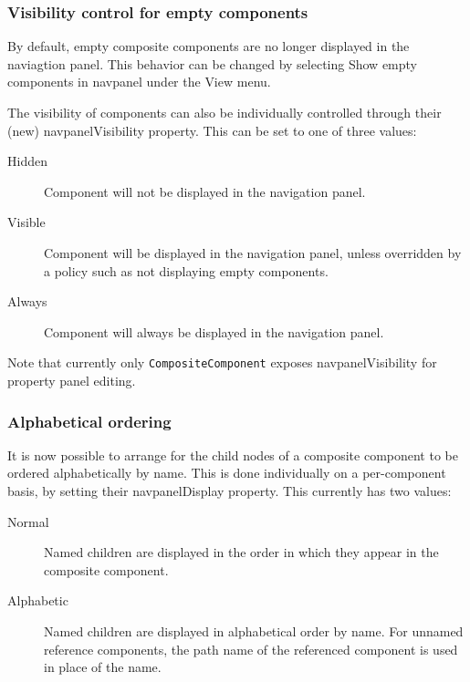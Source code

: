 \documentclass{article}
\begin{document}
\subsubsection*{Visibility control for empty components}

By default, empty composite components are no longer displayed in the
naviagtion panel. This behavior can be changed by selecting {\sf Show
empty components in navpanel} under the {\sf View} menu.

The visibility of components can also be individually controlled
through their (new) {\sf navpanelVisibility} property. This can be set
to one of three values:

\begin{description}

\item[Hidden] Component will not be displayed in the navigation panel.

\item[Visible] Component will be displayed in the navigation panel,
unless overridden by a policy such as not displaying empty components.

\item[Always] Component will always be displayed in the navigation panel.

\end{description}

Note that currently only {\tt CompositeComponent} exposes {\sf
navpanelVisibility} for property panel editing.

\subsubsection*{Alphabetical ordering}

It is now possible to arrange for the child nodes of a composite
component to be ordered alphabetically by name. This is done
individually on a per-component basis, by setting their {\sf
navpanelDisplay} property. This currently has two values:

\begin{description}

\item[Normal] Named children are displayed in the order in which they appear
in the composite component.

\item[Alphabetic] Named children are displayed in alphabetical order
by name. For unnamed reference components, the path name of the
referenced component is used in place of the name.

\end{description}
\end{document}
